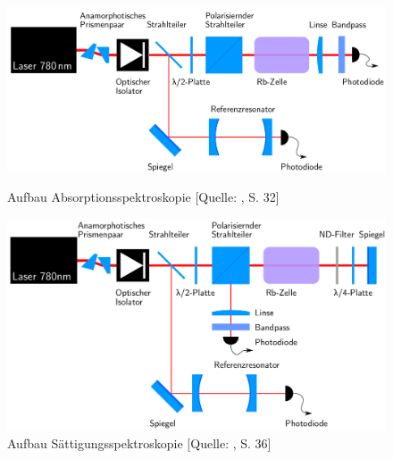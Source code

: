 \begin{figure}[!h]
    \begin{minipage}{8cm}
        \centering
        \includegraphics[scale = 0.30]{figures/images/absorp-aufbau.png}
        \caption{Aufbau Absorptionsspektroskopie [Quelle: \cite{H2}, S. 32]}
        \label{fig:Versuchsaufbau-Abs}
    \end{minipage}
    \hfill
    \begin{minipage}{8cm}
        \centering
        \includegraphics[scale = 0.25]{figures/images/saettig-aufbau.png}
        \caption{Aufbau Sättigungsspektroskopie [Quelle: \cite{H2}, S. 36]}
        \label{fig:Versuchsaufbau-Saet}
    \end{minipage}
\end{figure}

